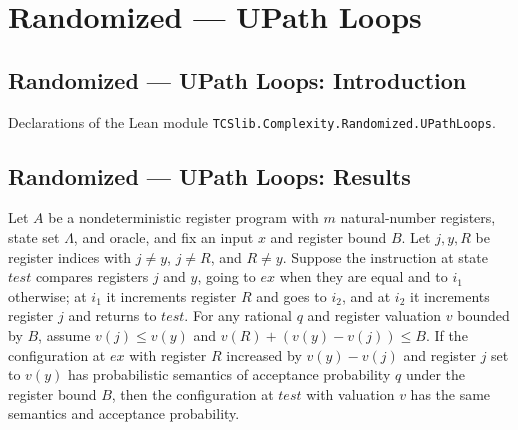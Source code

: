 \section{Randomized --- UPath Loops}
\subsection*{Randomized --- UPath Loops: Introduction}

Declarations of the Lean module \texttt{TCSlib.Complexity.Randomized.UPathLoops}.

\subsection*{Randomized --- UPath Loops: Results}

\begin{theorem}
\label{Complexity.LogProg.psem_addOnce}
\leanok
{}
Let $A$ be a nondeterministic register program with $m$ natural-number registers, state
set $\Lambda$, and oracle, and fix an input $x$ and register bound $B$. Let $j,y,R$ be
register indices with $j\ne y$, $j\ne R$, and $R\ne y$. Suppose the instruction at state
$test$ compares registers $j$ and $y$, going to $ex$ when they are equal and to $i_1$
otherwise; at $i_1$ it increments register $R$ and goes to $i_2$, and at $i_2$ it
increments register $j$ and returns to $test$. For any rational $q$ and register
valuation $v$ bounded by $B$, assume $v(j)\le v(y)$ and $v(R)+(v(y)-v(j))\le B$. If the
configuration at $ex$ with register $R$ increased by $v(y)-v(j)$ and register $j$ set to
$v(y)$ has probabilistic semantics of acceptance probability $q$ under the register
bound $B$, then the configuration at $test$ with valuation $v$ has the same semantics
and acceptance probability.
\end{theorem}

